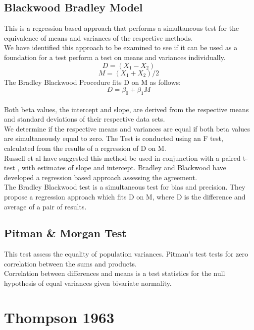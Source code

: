 \documentclass[12pt, a4paper]{article}
\begin{document}
\subsection{Blackwood Bradley Model} This is a regression based
approach that performs a simultaneous test for the equivalence of
means and variances of the respective methods.\\We have identified
this approach  to be examined to see if it can be used as a
foundation for a test perform a test on
means and variances individually.\\
\begin{equation}
D = (X_{1}-X_{2})
\end{equation}
\begin{equation}
M = (X_{1} + X_{2}) /2
\end{equation}
The Bradley Blackwood Procedure fits D on M as follows:\\
\begin{equation}
D = \beta_{0} + \beta_{1}M
\end{equation}
\\Both beta values, the intercept and slope, are derived from the respective means and
standard deviations of their respective data sets.\\
We determine if the respective means and variances are equal if
both beta values are simultaneously equal to zero. The Test is
conducted using an F test, calculated from the results of a
regression of D on M.
\\
Russell et al have suggested this method be used in conjunction
with a paired t-test , with estimates of slope and intercept.
Bradley and Blackwood have developed a regression based approach
assessing the agreement.
\\
The Bradley Blackwood test is a simultaneous test for bias and
precision. They propose a regression approach which fits D on M,
where D is the difference and average of a pair of results.



\subsection{Pitman \& Morgan Test} This test assess the equality
of population variances. Pitman's test tests for zero correlation
between the sums and products.
\\
Correlation between differences and means is a test statistics for
the null hypothesis of equal variances given bivariate normality.
\section{Thompson 1963}
\end{document}
